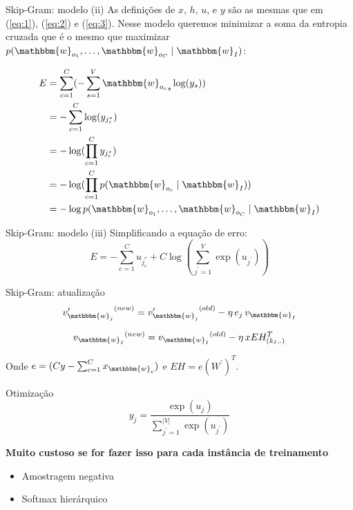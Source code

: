 \documentclass{beamer}
\newcommand{\wo}{\mathbbm{w}}
\begin{document}
\begin{frame}[fragile]{Skip-Gram: modelo (ii)}
As definições de $x$, $h$, $u$, e $y$ são as mesmas que em (\ref{eq:1}), (\ref{eq:2}) e (\ref{eq:3}). Nesse modelo queremos minimizar a soma da entropia cruzada que é o mesmo que maximizar $p(\wo_{o_{1}}, \dots, \wo_{o_{C}}\;|\;\wo_I)$:
 
\begin{align*}
E & = \sum_{c=1}^{C}(-\sum_{s=1}^{V} {\wo_{o_{c}}}_s \log(y_s)) \\
& = - \sum_{c=1}^{C} \log(y_{j^{*}_{c}})\\
& = - \log(\prod_{c=1}^{C}y_{j^{*}_{c}})\\
& = - \log(\prod_{c=1}^{C}p(\wo_{o_{c}}\;|\;\wo_I))\\
& = - \log p(\wo_{o_{1}}, \dots, \wo_{o_{C}}\;|\;\wo_I)\\
\end{align*}
\end{frame}
\begin{frame}[fragile]{Skip-Gram: modelo (iii)}
Simplificando a equação de erro:
\begin{equation}\label{eq:20}
E = - \sum_{c=1}^{C} u_{j^{*}_{c}} + C \log (\sum_{j^{\prime}=1}^{V} \exp (u_{j^{\prime}}))
\end{equation}
\end{frame}

\begin{frame}[fragile]{Skip-Gram: atualização}
\begin{equation}\label{eq:21}
{v^{\prime}_{\wo_{j}}}^{(new)} = {v^{\prime}_{\wo_{j}}}^{(old)} - \eta \, e_{j} \, v_{\wo_{I}}
\end{equation}

\vspace{0.3cm}

\begin{equation}\label{eq:22}
{v_{\wo_{I}}}^{(new)} = {v_{\wo_{I}}}^{(old)} - \eta \, x EH^{T}_{(k_{I},.)} 
\end{equation}

\vspace{0.3cm}

Onde $e = (Cy - \sum_{c=1}^{C}x_{\wo_{c}})$  e $EH = e {(W^{\prime})}^{T}$.
\end{frame}


\begin{frame}[fragile]{Otimização}
\[
y_j = \frac{\exp(u_j)}{\sum_{j^{\prime}=1}^{|V|} \exp(u_{j^{\prime}})} 
\]
\begin{center}
\textbf{Muito custoso se for fazer isso para cada instância de treinamento}
\end{center}
\vspace{0.3cm}

\begin{itemize}
\item Amostragem negativa
\vspace{0.2cm}
\item Softmax hierárquico
\end{itemize}


\end{frame}
\end{document}
